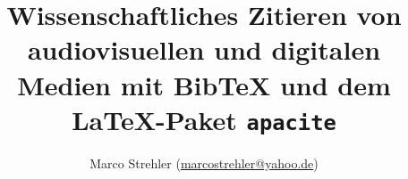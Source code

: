 
\title{Wissenschaftliches Zitieren von audiovisuellen und digitalen Medien mit BibTeX und dem \LaTeX-Paket \texttt{apacite}}
\author{Marco Strehler
  (\href{mailto:marcostrehler@yahoo.de}{marcostrehler@yahoo.de})}
